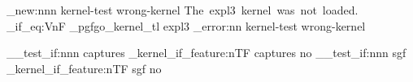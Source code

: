 \documentclass{article}
\begin{document}
\ExplSyntaxOn
\msg_new:nnn {kernel-test} {wrong-kernel} {The~expl3~kernel~was~not~loaded.}
\str_if_eq:VnF \g_pgfgo_kernel_tl {expl3} {\msg_error:nn {kernel-test} {wrong-kernel}}
\ExplSyntaxOff

\ExplSyntaxOn
\__test_if:nnn {captures} {\pgfgo_kernel_if_feature:nTF {captures}} {no}
\__test_if:nnn {sgf} {\pgfgo_kernel_if_feature:nTF {sgf}} {no}
\ExplSyntaxOff
\end{document}
